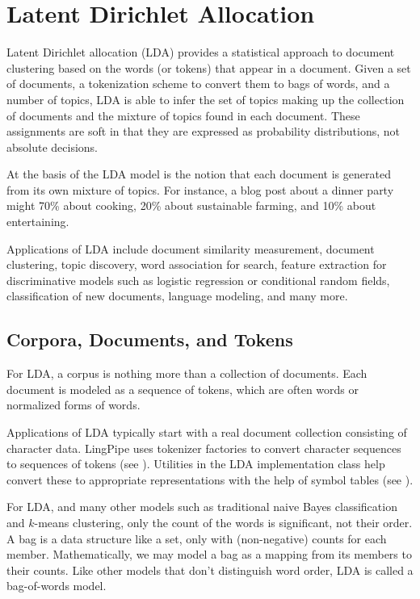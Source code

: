 \chapter{Latent Dirichlet Allocation}\label{chap:lda}

Latent Dirichlet allocation (LDA) provides a statistical approach to
document clustering based on the words (or tokens) that appear in a
document.  Given a set of documents, a tokenization scheme to convert
them to bags of words, and a number of topics, LDA is able to infer
the set of topics making up the collection of documents and the
mixture of topics found in each document.  These assignments are soft
in that they are expressed as probability distributions, not absolute
decisions.

At the basis of the LDA model is the notion that each document is
generated from its own mixture of topics.  For instance, a blog post
about a dinner party might 70\% about cooking, 20\% about sustainable
farming, and 10\% about entertaining.

Applications of LDA include document similarity measurement, document
clustering, topic discovery, word association for search, feature
extraction for discriminative models such as logistic regression or
conditional random fields, classification of new documents, language
modeling, and many more.

\section{Corpora, Documents, and Tokens}

For LDA, a corpus is nothing more than a collection of documents.
Each document is modeled as a sequence of tokens, which are often
words or normalized forms of words.

Applications of LDA typically start with a real document collection
consisting of character data.  LingPipe uses tokenizer factories to
convert character sequences to sequences of tokens (see
).  Utilities in the LDA implementation class
help convert these to appropriate representations with the help of
symbol tables (see ).

For LDA, and many other models such as traditional naive Bayes
classification and $k$-means clustering, only the count of the words
is significant, not their order.  A bag is a data structure like a
set, only with (non-negative) counts for each member.  Mathematically,
we may model a bag as a mapping from its members to their counts. Like
other models that don't distinguish word order, LDA is called a
bag-of-words model.



